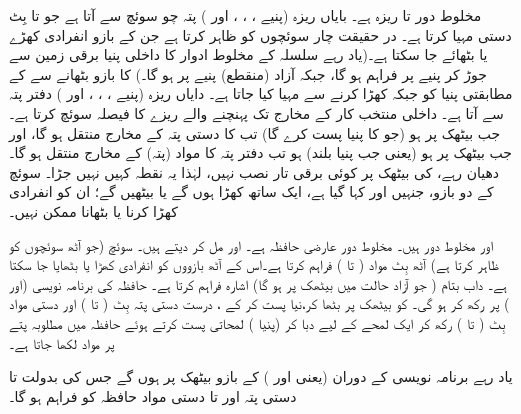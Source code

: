 مخلوط دور      تا  ریزہ ہے۔ بایاں ریزہ (پنیے ، ، ، اور )  پتہ  چو سوئچ  سے آتا ہے جو  تا  بِٹ دستی  مہیا کرتا ہے۔  در حقیقت چار سوئچوں کو ظاہر کرتا ہے جن کے بازو انفرادی کھڑے یا  بٹھائے جا سکتا ہے۔(یاد رہے    سلسلہ کے مخلوط ادوار کا داخلی  پنیا برقی زمین سے جوڑ کر  پنیے پر     فراہم  ہو گا، جبکہ آزاد (منقطع)   پنیے   پر   ہو گا۔)       کا  بازو  بٹھانے سے  کے مطابقتی پنیا کو   جبکہ کھڑا کرنے سے     مہیا کیا جاتا ہے۔  دایاں ریزہ (پنیے ، ، ، اور ) دفتر پتہ  سے آتا ہے۔ داخلی منتخب کار   کے مخارج تک پہنچنے والے ریزے   کا فیصلہ سوئچ   کرتا ہے۔ جب      بیٹھک پر   ہو  (جو   کا پنیا  پست کرے گا) تب  کا  دستی پتہ   کے مخارج   منتقل ہو گا، اور جب     بیٹھک پر ہو (یعنی جب پنیا   بلند)    ہو تب دفتر پتہ  کا مواد  (پتہ)  کے مخارج  منتقل ہو گا۔دھیان رہے،    کی  بیٹھک پر کوئی برقی تار نصب نہیں، لہٰذا یہ نقطہ کہیں نہیں جڑا۔ سوئچ   کے دو بازو، جنہیں  اور  کہا گیا ہے، ایک ساتھ کھڑا ہوں گے یا بیٹھیں گے؛ ان کو انفرادی کھڑا کرنا  یا بٹھانا ممکن  نہیں۔
 
    اور  مخلوط دور  ہیں۔   مخلوط دور  عارضی حافظہ ہے۔   اور  مل کر   دیتے ہیں۔ سوئچ    (جو آٹھ سوئچوں کو ظاہر کرتا ہے)  آٹھ بِٹ مواد ( تا )  فراہم کرتا ہے۔اس کے آٹھ بازووں کو انفرادی کھڑا یا بٹھایا جا  سکتا  ہے۔ داب بتام   ( جو آزاد حالت میں  بیٹھک پر ہو گا)          اشارہ فراہم کرتا ہے۔ حافظہ کی برنامہ نویسی    (اور )    پر رکھ کر ہو گی۔ کو    بیٹھک پر بٹھا کر،نیا پست کر کے ،  درست دستی پتہ   بِٹ  (     تا )  اور   دستی مواد بِٹ  ( تا )       رکھ کر   ایک لمحے کے لیے دبا کر  (پنیا )    لمحاتی پست  کرتے ہوئے حافظہ میں  مطلوبہ پتے   پر مواد لکھا جاتا ہے۔
   
یاد رہے برنامہ نویسی کے دوران   (یعنی  اور ) کے بازو  بیٹھک پر ہوں گے جس کی بدولت  تا  دستی  پتہ اور  تا  دستی  مواد حافظہ کو فراہم ہو گا۔
   
